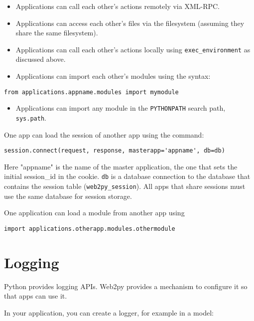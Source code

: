 \documentclass[justified,sixbynine,notoc]{tufte-book}
\def\ft{\small\tt}
\begin{document}
\begin{fullwidth}
\begin{itemize}
\item Applications can call each other's actions remotely via XML-RPC.

\item Applications can access each other's files via the filesystem (assuming they share the same filesystem).

\item Applications can call each other's actions locally using {\ft exec\_environment} as discussed above.

\item Applications can import each other's modules using the syntax:
\end{itemize}
\begin{lstlisting}
from applications.appname.modules import mymodule
\end{lstlisting}

\begin{itemize}
\item Applications can import any module in the {\ft PYTHONPATH} search path, {\ft sys.path}.
\end{itemize}

One app can load the session of another app using the command:

\begin{lstlisting}
session.connect(request, response, masterapp='appname', db=db)
\end{lstlisting}

Here "appname" is the name of the master application, the one that sets the initial session\_id in the cookie. {\ft db} is a database connection to the database that contains the session table ({\ft web2py\_session}). All apps that share sessions must use the same database for session storage.

One application can load a module from another app using

\begin{lstlisting}
import applications.otherapp.modules.othermodule
\end{lstlisting}

\goodbreak\section{Logging}

Python provides logging APIs. Web2py provides a mechanism to configure it so
that apps can use it.

In your application, you can create a logger, for example in a model:


\end{fullwidth}
\end{document}
